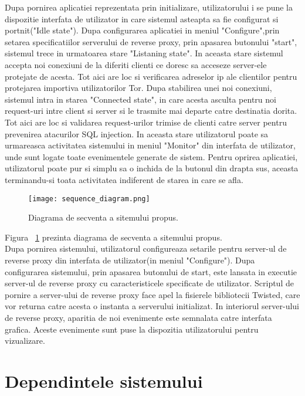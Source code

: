 Dupa pornirea aplicatiei reprezentata prin initializare, utilizatorului i se pune la dispozitie interfata de utilizator in care sistemul asteapta sa fie configurat si portnit("Idle state"). Dupa configurarea aplicatiei in meniul "Configure",prin setarea specificatiilor serverului de reverse proxy, prin apasarea butonului "start", sistemul trece in urmatoarea stare "Listaning state". In aceasta stare sistemul accepta noi conexiuni de la diferiti clienti ce doresc sa acceseze server-ele protejate de acesta. Tot aici are loc si verificarea adreselor ip ale clientilor pentru protejarea importiva utilizatorilor Tor. Dupa stabilirea unei noi conexiuni, sistemul intra in starea "Connected state", in care acesta asculta pentru noi request-uri intre client si server si le trasmite mai departe catre destinatia dorita. Tot aici are loc si validarea request-urilor trimise de clienti catre server pentru prevenirea atacurilor SQL injection.
In aceasta stare utilizatorul poate sa urmareasca activitatea sistemului in meniul "Monitor" din interfata de utilizator, unde sunt logate toate evenimentele generate de sistem. Pentru oprirea aplicatiei, utilizatorul poate pur si simplu sa o inchida de la butonul din drapta sus, aceasta terminandu-si toata activitatea indiferent de starea in care se afla.

\begin{figure}[h]
	\centering
	\texttt{[image: sequence\_diagram.png]}
	\caption{Diagrama de secventa a sitemului propus.}
	\label{fig:sequence}
\end{figure}
Figura ~\ref{fig:sequence} prezinta diagrama de secventa a sitemului propus. \\
Dupa pornirea sistemului, utilizatorul configureaza setarile pentru server-ul de reverse proxy din interfata de utilizator(in meniul "Configure"). Dupa configurarea sistemului, prin apasarea butonului de start, este lansata in executie server-ul de reverse proxy cu caracteristicele specificate de utilizator. Scriptul de pornire a server-ului de reverse proxy face apel la fisierele bibliotecii Twisted, care vor returna catre acesta o instanta a serverului initializat. In interiorul server-ului de reverse proxy, aparitia de noi evenimente este semnalata catre interfata grafica. Aceste evenimente sunt puse la dispozitia utilizatorului pentru vizualizare.
\\
\section{Dependintele sistemului}

